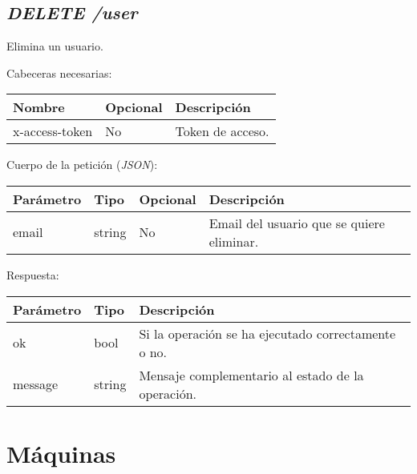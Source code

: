 \subsection{\textit{DELETE /user}}
Elimina un usuario.

Cabeceras necesarias:
\begin{table}[h!]
	\centering
	\begin{adjustbox}{max width=\textwidth}
	\begin{tabular}{|l|l|l|}
		\hline
		Nombre & Opcional & Descripción \\ \hline
		x-access-token & No & Token de acceso. \\ \hline
	\end{tabular}
\end{adjustbox}
\end{table}

Cuerpo de la petición (\textit{JSON}):
\begin{table}[h!]
	\centering
	\begin{adjustbox}{max width=\textwidth}
	\begin{tabular}{|l|l|l|l|}
		\hline
		Parámetro & Tipo & Opcional & Descripción \\ \hline
		email & string & No & Email del usuario que se quiere eliminar. \\ \hline
	\end{tabular}
\end{adjustbox}
\end{table}

Respuesta:
\begin{table}[h!]
	\centering
	\begin{adjustbox}{max width=\textwidth}
	\begin{tabular}{|l|l|l|}
		\hline
		Parámetro & Tipo & Descripción \\ \hline
		ok & bool & Si la operación se ha ejecutado correctamente o no. \\ \hline
		message & string & Mensaje complementario al estado de la operación. \\ \hline
	\end{tabular}
\end{adjustbox}
\end{table}




\pagebreak

\section{Máquinas}

